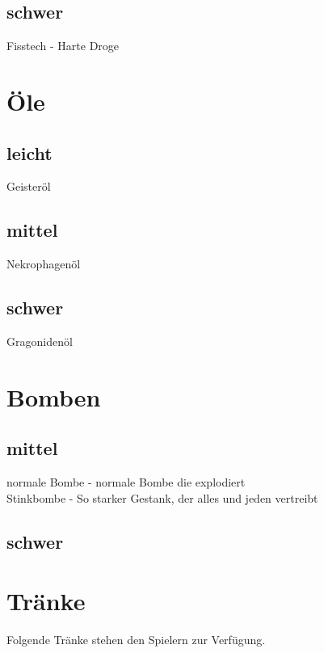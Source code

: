 \subsection{schwer}
Fisstech - Harte Droge \\


\section{Öle}
\subsection{leicht}
Geisteröl \\
\subsection{mittel}
Nekrophagenöl \\
\subsection{schwer}
Gragonidenöl \\


\section{Bomben}
\subsection{mittel}
normale Bombe - normale Bombe die explodiert \\
Stinkbombe - So starker Gestank, der alles und jeden vertreibt \\

\subsection{schwer}




\section{Tränke}
Folgende Tränke stehen den Spielern zur Verfügung. 

